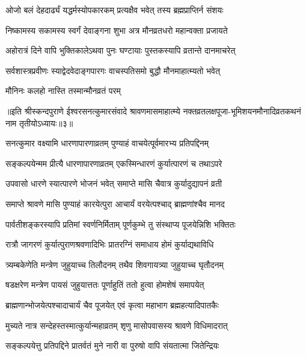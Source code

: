 \twolineshloka
{ओजो बलं देहदार्ढ्यं यद्धर्मस्योपकारकम्}
{प्रत्यक्षैव भवेत् तस्य ब्रह्मप्राप्तिर्न संशयः} %

\twolineshloka
{निष्कामस्य सकामस्य स्वर्गं देवाङ्गना शुभा}
{अत्र मौनव्रतधरो महान्वक्ता प्रजायते} %

\twolineshloka
{अहोरात्रं दिने वापि भुक्तिकालेऽथवा पुनः}
{घण्टायाः पुस्तकस्यापि व्रतान्ते दानमाचरेत्} %

\twolineshloka
{सर्वशास्त्रप्रवीणः स्याद्वेदवेदाङ्गपारगः}
{वाचस्पतिसमो बुद्धौ मौनमाहात्म्यतो भवेत्} %

\onelineshloka
{मौनिनः कलहो नास्ति तस्मान्मौनव्रतं परम्} %


{॥इति श्रीस्कन्दपुराणे ईश्वरसनत्कुमारसंवादे श्रावणमासमाहात्म्ये नक्तव्रतलक्षपूजा-भूमिशयनमौनादिव्रतकथनं नाम तृतीयोऽध्यायः॥३॥}




\twolineshloka
{सनत्कुमार वक्ष्यामि धारणापारणाव्रतम्}
{पुण्याहं वाचयेत्पूर्वमारभ्य प्रतिपद्दिनम्} %

\twolineshloka
{सङ्कल्पयेन्मम प्रीत्यै धारणापारणाव्रतम्}
{एकस्मिन्धारणं कुर्यात्पारणं च तथाऽपरे} %

\twolineshloka
{उपवासो धारणे स्यात्पारणे भोजनं भवेत्}
{समाप्ते मासि चैवात्र कुर्यादुद्यापनं व्रती} %

\twolineshloka
{समाप्ते श्रावणे मासि पुण्याहं कारयेत्पुरा}
{आचार्यं वरयेत्पश्चाद् ब्राह्मणांश्चैव मानद} %

\twolineshloka
{पार्वतीशङ्करस्यापि प्रतिमां स्वर्णनिर्मिताम्}
{पूर्णकुम्भे तु संस्थाप्य पूजयेन्निशि भक्तितः} %

\twolineshloka
{रात्रौ जागरणं कुर्यात्पुराणश्रवणादिभिः}
{प्रातरग्निं समाधाय होमं कुर्याद्यथाविधि} %

\twolineshloka
{त्र्यम्बकेणेति मन्त्रेण जुहुयाच्च तिलौदनम्}
{तथैव शिवगायत्र्या जुहुयाच्च घृतौदनम्} %

\twolineshloka
{षडक्षरेण मन्त्रेण पायसं जुहुयात्ततः}
{पूर्णाहुतिं ततो हुत्वा होमशेषं समापयेत्} %

\twolineshloka
{ब्राह्मणान्भोजयेत्पश्चादाचार्यं चैव पूजयेत्}
{एवं कृत्वा महाभाग ब्रह्महत्यादिपातकैः} %

\twolineshloka
{मुच्यते नात्र सन्देहस्तस्मात्कुर्यान्महाव्रतम्}
{शृणु मासोपवासस्य श्रावणे विधिमादरात्} %

\twolineshloka
{सङ्कल्पयेत्तु प्रतिपद्दिने प्रातर्वतं मुने}
{नारी वा पुरुषो वापि संयतात्मा जितेन्द्रियः} %

